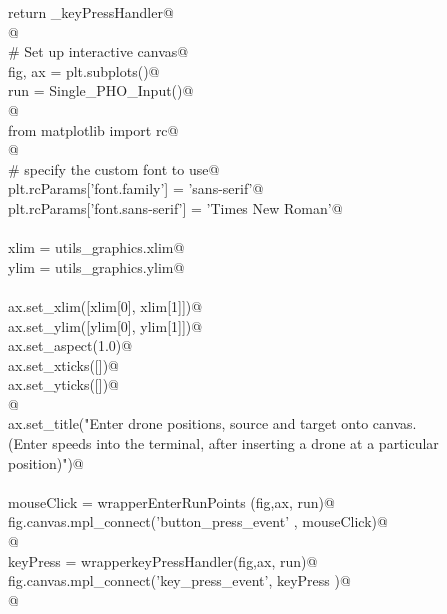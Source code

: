 \documentclass[10pt, english, oneside]{report}
\begin{document}
\begin{appendices}
\begin{flushleft}
\begin{list}{}{}
\mbox{}\verb@           return _keyPressHandler@\\
\mbox{}\verb@    @\\
\mbox{}\verb@    # Set up interactive canvas@\\
\mbox{}\verb@    fig, ax =  plt.subplots()@\\
\mbox{}\verb@    run = Single_PHO_Input()@\\
\mbox{}\verb@        @\\
\mbox{}\verb@    from matplotlib import rc@\\
\mbox{}\verb@    @\\
\mbox{}\verb@    # specify the custom font to use@\\
\mbox{}\verb@    plt.rcParams['font.family'] = 'sans-serif'@\\
\mbox{}\verb@    plt.rcParams['font.sans-serif'] = 'Times New Roman'@\\
\mbox{}\verb@@\\
\mbox{}\verb@    xlim = utils_graphics.xlim@\\
\mbox{}\verb@    ylim = utils_graphics.ylim@\\
\mbox{}\verb@@\\
\mbox{}\verb@    ax.set_xlim([xlim[0], xlim[1]])@\\
\mbox{}\verb@    ax.set_ylim([ylim[0], ylim[1]])@\\
\mbox{}\verb@    ax.set_aspect(1.0)@\\
\mbox{}\verb@    ax.set_xticks([])@\\
\mbox{}\verb@    ax.set_yticks([])@\\
\mbox{}\verb@          @\\
\mbox{}\verb@    ax.set_title("Enter drone positions, source and target onto canvas. \n \@\\
\mbox{}\verb@(Enter speeds into the terminal, after inserting a drone at a particular position)")@\\
\mbox{}\verb@@\\
\mbox{}\verb@    mouseClick   = wrapperEnterRunPoints (fig,ax, run)@\\
\mbox{}\verb@    fig.canvas.mpl_connect('button_press_event' , mouseClick)@\\
\mbox{}\verb@          @\\
\mbox{}\verb@    keyPress     = wrapperkeyPressHandler(fig,ax, run)@\\
\mbox{}\verb@    fig.canvas.mpl_connect('key_press_event', keyPress   )@\\
\mbox{}\verb@    @\\

\end{list}
\end{flushleft}
\end{appendices}
\end{document}
